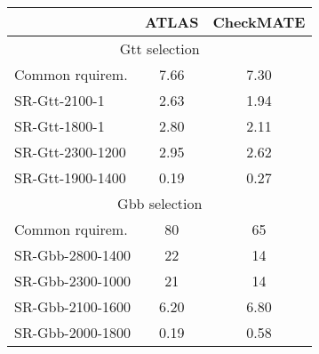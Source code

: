 \documentclass[12pt,fleqn]{article}
\begin{document}
\newpage

\begin{table}[h!] \begin{center}
 \renewcommand*{\arraystretch}{1.2}
 \begin{tabular}{l|c|c} \toprule
  & ATLAS & CheckMATE \\ \midrule
  \multicolumn{3}{c}{Gtt selection} \\ \midrule
  Common rquirem. & 7.66 &  7.30\\
  SR-Gtt-2100-1 & 2.63 &  1.94  \\
  SR-Gtt-1800-1 & 2.80 &  2.11\\
  SR-Gtt-2300-1200 & 2.95 & 2.62\\
  SR-Gtt-1900-1400 & 0.19 & 0.27\\
  \midrule
  \multicolumn{3}{c}{Gbb selection}\\ \midrule
  Common rquirem. & 80 &  65\\
  SR-Gbb-2800-1400 & 22   & 14 \\
  SR-Gbb-2300-1000 & 21   & 14 \\
  SR-Gbb-2100-1600 & 6.20 & 6.80 \\
  SR-Gbb-2000-1800 & 0.19 & 0.58 \\ \bottomrule
  \end{tabular}
 \end{center}
\end{table} 
  
\end{document}
